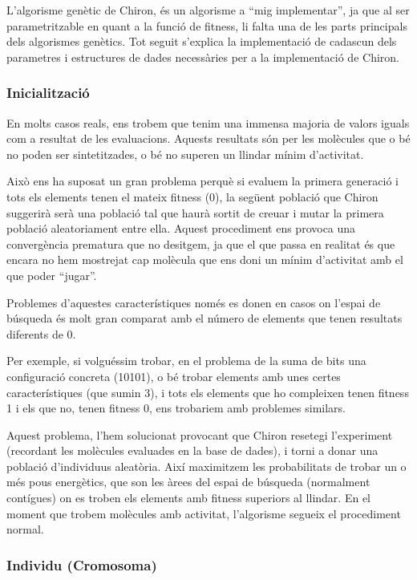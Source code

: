 L'algorisme genètic de Chiron, és un algorisme a ``mig implementar'', ja que al
ser parametritzable en quant a la funció de fitness, li falta una de les parts
principals dels algorismes genètics.  Tot seguit s'explica la implementació de
cadascun dels parametres i estructures de dades necessàries per a la
implementació de Chiron.

\subsubsection{Inicialització} %
\label{ssub:Inicialitzacio}

En  molts casos reals, ens trobem que tenim una immensa majoria de valors iguals
com a resultat de les evaluacions.  Aquests resultats són per les molècules que
o bé no poden ser sintetitzades, o bé no superen un llindar mínim d'activitat.

Això ens ha suposat un gran problema perquè si evaluem la primera generació i
tots els elements tenen el mateix fitness (0), la següent població que Chiron
suggerirà serà una població tal que haurà sortit de creuar i mutar la primera
població aleatoriament entre ella.  Aquest procediment ens provoca una
convergència prematura que no desitgem, ja que el que passa en realitat és que
encara no hem mostrejat cap molècula que ens doni un mínim d'activitat amb el
que poder ``jugar''.

Problemes d'aquestes característiques només es donen en casos on l'espai de
búsqueda és molt gran comparat amb el número de elements que tenen resultats
diferents de 0.

Per exemple, si volguéssim trobar, en el problema de la suma de bits una
configuració concreta (10101), o bé trobar elements amb unes certes
característiques (que sumin 3), i tots els elements que ho compleixen tenen
fitness 1 i els que no, tenen fitness 0, ens trobariem amb problemes similars.

Aquest problema, l'hem solucionat provocant que Chiron resetegi l'experiment
(recordant les molècules evaluades en la base de dades), i torni a donar una
població d'individuus aleatòria.  Així maximitzem les probabilitats de trobar un
o més pous energètics, que son les àrees del espai de búsqueda (normalment
contígues) on es troben els elements amb fitness superiors al llindar.  En el
moment que trobem molècules amb activitat, l'algorisme segueix el procediment
normal.


\subsubsection{Individu (Cromosoma)}
\label{ssub:individu (cromosoma)}

